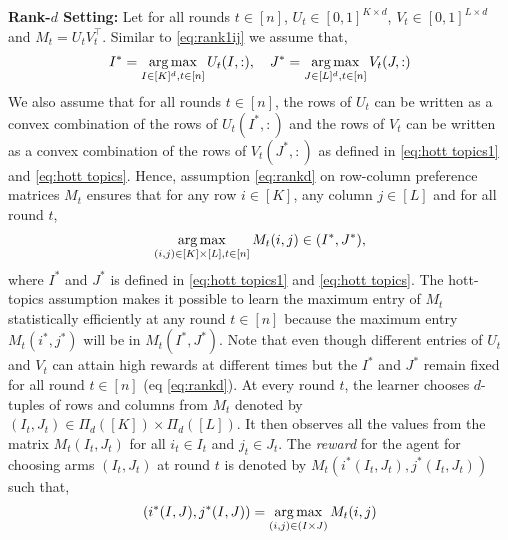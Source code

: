 \textbf{Rank-$d$ Setting:} Let for all rounds $t\in[n]$, $U_t \in [0,1]^{K\times d}$, $V_t \in [0,1]^{L\times d}$ and $M_t = U_t V_t^{\intercal}$. Similar to \eqref{eq:rank1ij} we assume that,
\begin{align}
I^\ast = \mathop{\rm arg\,max}_{I\in[K]^d, t\in [n]}U_{t}(I,:), \hspace*{1em} J^\ast = \mathop{\rm arg\,max}_{J\in[L]^d, t\in [n]}V_{t}(J,:) \label{eq:rankd}
\end{align}
We also assume that for all rounds $t\in [n]$, the rows of $U_t$ can be written as a convex combination of the rows of $U_t(I^\ast, :)$ and the rows of $V_t$ can be written as a convex combination of the rows of $V_t(J^\ast, :)$ as defined in \eqref{eq:hott topics1} and \eqref{eq:hott topics}. Hence, assumption \eqref{eq:rankd} on row-column preference matrices $M_t$ ensures that for any row $i \in [K]$, any column $j \in [L]$ and for all round $t$,
\begin{align}
  \mathop{\rm arg\,max}_{(i, j) \in [K] \times [L], t\in [n]} M_t(i, j) \in (I^\ast, J^\ast) \label{eq:rewardProp},
\end{align}
where $I^\ast$ and $J^\ast$ is defined in \eqref{eq:hott topics1} and \eqref{eq:hott topics}. The hott-topics assumption makes it possible to learn the maximum entry of $M_t$ statistically efficiently at any round $t\in[n]$ because the maximum entry $M_t(i^*,j^*)$ will be in $M_t(I^*,J^*)$. Note that even though different entries of $U_t$ and $V_t$ can attain high rewards at different times but the $I^*$ and $J^*$ remain fixed for all round $t\in[n]$ (eq \ref{eq:rankd}). 
At every round $t$, the learner chooses $d$-tuples of rows and columns from $M_t$ denoted by $(I_t,J_t)\in \Pi_d([K])\times \Pi_d([L])$. It then observes all the values from the matrix $M_{t}(I_t,J_t)$ for all $i_t\in I_t$ and $j_t \in J_t$. The \emph{reward} for the agent for choosing arms $(I_t,J_t)$ at round $t$ is denoted by $M_t(i^\ast(I_t,J_t),j^\ast(I_t,J_t))$ such that,
\begin{align}
  (i^\ast(I,J),j^\ast(I,J)) = \mathop{\rm arg\,max}_{(i,j) \in (I\times J)} M_{t}(i,j)
  \label{eq:reward}
\end{align}


